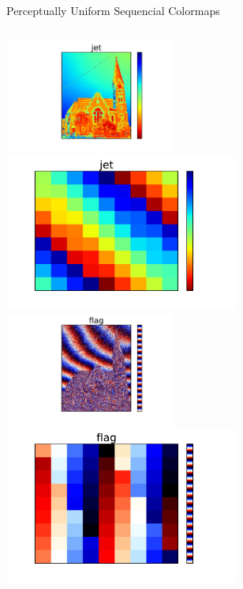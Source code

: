 \documentclass{beamer}
\newcommand{\semitransp}[2][35]{\color{fg!#1}#2}
\begin{document}
\begin{frame}
\begin{center}
\semitransp[0]{Perceptually Uniform Sequencial Colormaps}
\end{center}
\begin{columns}
\begin{column}{0.5\textwidth}
\begin{center}
\vfill
\includegraphics[width=0.42\textwidth]{church_jet.pdf}
\includegraphics[width=0.58\textwidth]{magicsquare_jet.pdf}\newline\newline
\vfill
\includegraphics[width=0.42\textwidth]{church_flag.pdf}
\includegraphics[width=0.58\textwidth]{magicsquare_flag.pdf}
\vfill
\end{center}

\end{column}
\end{columns}
\end{frame}
\end{document}
